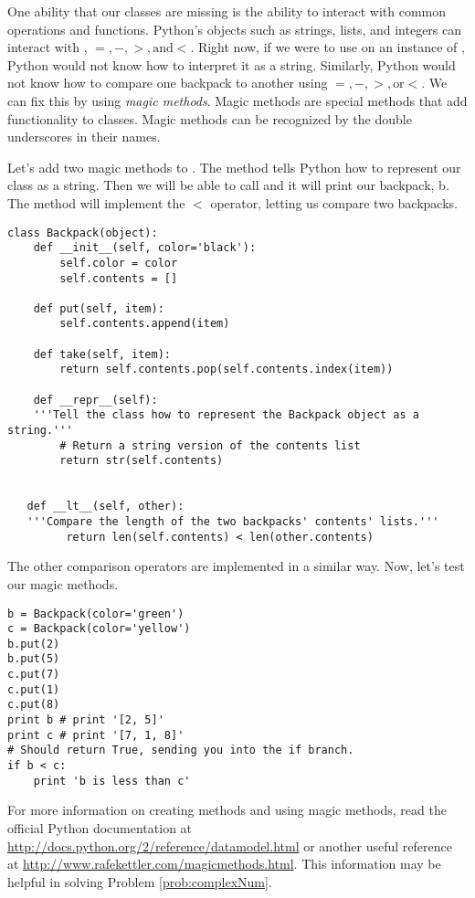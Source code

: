One ability that our classes are missing is the ability to interact with common operations and functions.
Python's objects such as strings, lists, and integers can interact with ,  $ =, - , >, \text{and} <$.
Right now, if we were to use  on an instance of , Python would not know how to interpret it as a string.
Similarly, Python would not know how to compare one backpack to another using $ =, - , >, \text{or} <$.
We can fix this by using \emph{magic methods}.
Magic methods are special methods that add functionality to classes.
Magic methods can be recognized by the double underscores in their names.

Let's add two magic methods to .
The  method tells Python how to represent our class as a string.
Then we will be able to call  and it will print our backpack, b.
The  method will implement the $<$ operator, letting us compare two backpacks.

\begin{lstlisting}
class Backpack(object):
    def __init__(self, color='black'):
    	self.color = color
    	self.contents = []

    def put(self, item):
    	self.contents.append(item)

    def take(self, item):
    	return self.contents.pop(self.contents.index(item))

    def __repr__(self):
    '''Tell the class how to represent the Backpack object as a string.'''
    	# Return a string version of the contents list
        return str(self.contents)


   def __lt__(self, other):
   '''Compare the length of the two backpacks' contents' lists.'''
     	 return len(self.contents) < len(other.contents)

\end{lstlisting}

The other comparison operators are implemented in a similar way.
Now, let's test our magic methods.

\begin{lstlisting}
b = Backpack(color='green')
c = Backpack(color='yellow')
b.put(2)
b.put(5)
c.put(7)
c.put(1)
c.put(8)
print b # print '[2, 5]'
print c # print '[7, 1, 8]'
# Should return True, sending you into the if branch.
if b < c:
	print 'b is less than c'

\end{lstlisting}

For more information on creating methods and using magic methods, read the official Python documentation at \url {http://docs.python.org/2/reference/datamodel.html} or another useful reference at \url{http://www.rafekettler.com/magicmethods.html}.
This information may be helpful in solving Problem \ref{prob:complexNum}.

